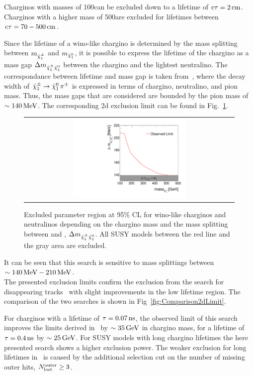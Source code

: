 Charginos with masses of 100\gev can be excluded down to a lifetime of $\text{c}\tau=2\,\text{cm}$.
Charginos with a higher mass of 500\gev are excluded for lifetimes between $\text{c}\tau=70-500\,\text{cm}$.

Since the lifetime of a wino-like chargino is determined by the mass splitting between $m_{\tilde{\chi}^{\pm}_{1}}$ and $m_{\tilde{\chi}^{0}_{1}}$, 
it is possible to express the lifetime of the chargino as a mass gap $\Delta m_{\tilde{\chi}^{\pm}_{1}\tilde{\chi}^{0}_{1}}$ between the chargino and the lightest neutralino.
The correspondance between lifetime and mass gap is taken from~\cite{bib:MassSplitting_Drees}, where the decay width of $\tilde{\chi}^{\pm}_{1} \rightarrow \tilde{\chi}^{0}_{1}\, \pi^{\pm}$ is expressed in terms of chargino, neutralino, and pion mass.
Thus, the mass gaps that are considered are bounded by the pion mass of $\sim140\,\text{Me}\kern-0.06667em\text{V}$.
The corresponding 2d exclusion limit can be found in Fig.~\ref{fig:DeltaMLimit2d}.
\begin{figure}[!t]
  \centering 
  \begin{tabular}{c}
    \includegraphics[width=0.55\textwidth]{figures/analysis/Interpretation/MassSplittingLimitPlot.pdf} 
  \end{tabular}
  \caption{Excluded parameter region at 95\% CL for wino-like charginos and neutralinos depending on the chargino mass and the mass splitting between \chipm and \chiO, $\Delta m_{\tilde{\chi}^{\pm}_{1}\tilde{\chi}^{0}_{1}}$.
          All SUSY models between the red line and the gray area are excluded.}
  \label{fig:DeltaMLimit2d}
\end{figure} 
It can be seen that this search is sensitive to mass splittings between $\sim 140\,\text{Me}\kern-0.06667em\text{V}-210\,\text{Me}\kern-0.06667em\text{V}$.\\

The presented exclusion limits confirm the exclusion from the search for disappearing tracks~\cite{bib:CMS:DT_8TeV} with slight improvements in the low lifetime region.
The comparison of the two searches is shown in Fig~\ref{fig:Comparison2dLimit}.

For charginos with a lifetime of $\tau=0.07\,\text{ns}$, the observed limit of this search improves the limits derived in~\cite{bib:CMS:DT_8TeV} by $\sim35\,\text{Ge}\kern-0.06667em\text{V}$ in chargino mass, for a lifetime of $\tau=0.4\,\text{ns}$ by $\sim25\,\text{Ge}\kern-0.06667em\text{V}$. 
For SUSY models with long chargino lifetimes the here presented search shows a higher exclusion power.
The weaker exclusion for long lifetimes in~\cite{bib:CMS:DT_8TeV} is caused by the additional selection cut on the number of missing outer hits, $N_{\text{lost}}^{\text{outer}}\geq3$.

